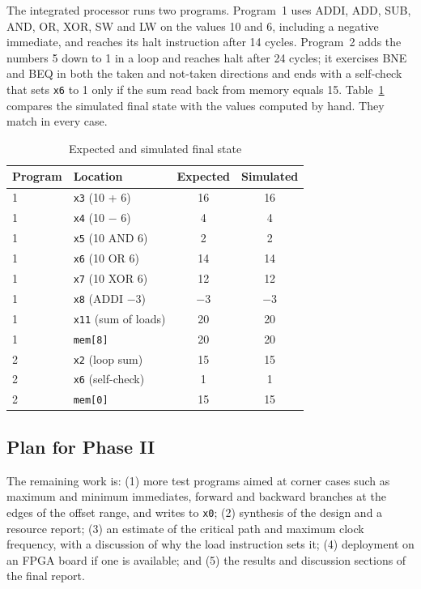 \documentclass[conference]{IEEEtran}
\begin{document}
The integrated processor runs two programs. Program~1 uses ADDI, ADD, SUB,
AND, OR, XOR, SW and LW on the values 10 and 6, including a negative
immediate, and reaches its halt instruction after 14 cycles. Program~2 adds
the numbers 5 down to 1 in a loop and reaches halt after 24 cycles; it
exercises BNE and BEQ in both the taken and not-taken directions and ends
with a self-check that sets \texttt{x6} to 1 only if the sum read back from
memory equals 15. Table~\ref{tab:results} compares the simulated final state
with the values computed by hand. They match in every case.

\begin{table}[!htb]
\caption{Expected and simulated final state}
\label{tab:results}
\centering
\begin{tabular}{llcc}
\toprule
Program & Location & Expected & Simulated \\
\midrule
1 & \texttt{x3} (10 + 6)     & 16 & 16 \\
1 & \texttt{x4} (10 $-$ 6)   & 4  & 4 \\
1 & \texttt{x5} (10 AND 6)   & 2  & 2 \\
1 & \texttt{x6} (10 OR 6)    & 14 & 14 \\
1 & \texttt{x7} (10 XOR 6)   & 12 & 12 \\
1 & \texttt{x8} (ADDI $-$3)  & $-$3 & $-$3 \\
1 & \texttt{x11} (sum of loads) & 20 & 20 \\
1 & \texttt{mem[8]}          & 20 & 20 \\
2 & \texttt{x2} (loop sum)   & 15 & 15 \\
2 & \texttt{x6} (self-check) & 1  & 1 \\
2 & \texttt{mem[0]}          & 15 & 15 \\
\bottomrule
\end{tabular}
\end{table}

\subsection{Plan for Phase II}
The remaining work is: (1) more test programs aimed at corner cases such as
maximum and minimum immediates, forward and backward branches at the edges of
the offset range, and writes to \texttt{x0}; (2) synthesis of the design and a
resource report; (3) an estimate of the critical path and maximum clock
frequency, with a discussion of why the load instruction sets it;
(4) deployment on an FPGA board if one is available; and (5) the results and
discussion sections of the final report.
\end{document}
